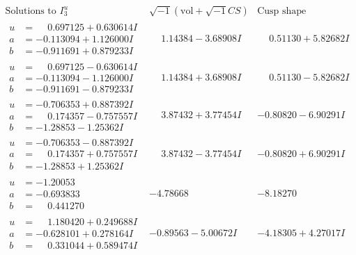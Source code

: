 \documentclass[1p]{elsarticle_modified}
\theoremstyle{definition}
\newcommand{\I}{\sqrt{-1}}
\begin{document}
$$\begin{array}{c|c|c}  
\text{Solutions to }I^u_{3}& \I (\text{vol} + \sqrt{-1}CS) & \text{Cusp shape}\\
 \hline 
\begin{aligned}
u &= \phantom{-}0.697125 + 0.630614 I \\
a &= -0.113094 + 1.126000 I \\
b &= -0.911691 + 0.879233 I\end{aligned}
 & \phantom{-}1.14384 - 3.68908 I & \phantom{-}0.51130 + 5.82682 I \\ \hline\begin{aligned}
u &= \phantom{-}0.697125 - 0.630614 I \\
a &= -0.113094 - 1.126000 I \\
b &= -0.911691 - 0.879233 I\end{aligned}
 & \phantom{-}1.14384 + 3.68908 I & \phantom{-}0.51130 - 5.82682 I \\ \hline\begin{aligned}
u &= -0.706353 + 0.887392 I \\
a &= \phantom{-}0.174357 - 0.757557 I \\
b &= -1.28853 - 1.25362 I\end{aligned}
 & \phantom{-}3.87432 + 3.77454 I & -0.80820 - 6.90291 I \\ \hline\begin{aligned}
u &= -0.706353 - 0.887392 I \\
a &= \phantom{-}0.174357 + 0.757557 I \\
b &= -1.28853 + 1.25362 I\end{aligned}
 & \phantom{-}3.87432 - 3.77454 I & -0.80820 + 6.90291 I \\ \hline\begin{aligned}
u &= -1.20053\phantom{ +0.000000I} \\
a &= -0.693833\phantom{ +0.000000I} \\
b &= \phantom{-}0.441270\phantom{ +0.000000I}\end{aligned}
 & -4.78668\phantom{ +0.000000I} & -8.18270\phantom{ +0.000000I} \\ \hline\begin{aligned}
u &= \phantom{-}1.180420 + 0.249688 I \\
a &= -0.628101 + 0.278164 I \\
b &= \phantom{-}0.331044 + 0.589474 I\end{aligned}
 & -0.89563 - 5.00672 I & -4.18305 + 4.27017 I \\ \hline\begin{aligned}

\end{aligned}
\end{array}$$
\end{document}
